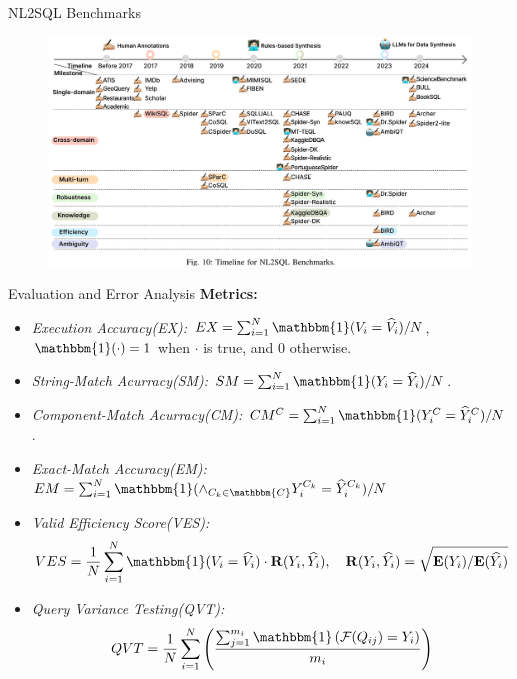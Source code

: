 \documentclass[aspectratio=169,xcolor=dvipsnames]{beamer}
\begin{document}

\begin{frame}{NL2SQL Benchmarks}
    \begin{figure}
        \includegraphics[width=\linewidth]{assets/benchmarks.png}
    \end{figure}
\end{frame}


\begin{frame}{Evaluation and Error Analysis}
    \textbf{Metrics: }
    \begin{itemize}
        \item \textit{Execution Accuracy(EX):} $EX=\sum_{i=1}^N \mathbbm{1}(V_i=\widehat{V}_i) / N$, $\mathbbm{1}(\cdot)=1$ when $\cdot$ is true, and $0$ otherwise.
        \item \textit{String-Match Acurracy(SM):} $SM=\sum_{i=1}^N \mathbbm{1}(Y_i=\widehat{Y}_i) / N$.
        \item \textit{Component-Match Acurracy(CM):} $CM^C=\sum_{i=1}^N \mathbbm{1}(Y_i^C=\widehat{Y}_i^C) / N$.
        \item \textit{Exact-Match Accuracy(EM):}$EM=\sum_{i=1}^N \mathbbm{1}(\land_{C_k\in \mathbbm{C}} Y_i^{C_k}=\widehat{Y}_i^{C_k}) / N$
        \item \textit{Valid Efficiency Score(VES):}
        \[
            VES=\frac{1}{N}\sum_{i=1}^N \mathbbm{1}(V_i=\widehat{V}_i)\cdot \mathbf{R}(Y_i, \widehat{Y_i}),\quad \mathbf{R}(Y_i, \widehat{Y_i}) =\sqrt{\mathbf{E}(Y_i)/\mathbf{E}(\widehat{Y_i})}
        \]
        \item \textit{Query Variance Testing(QVT):}
        \[
            QVT=\frac{1}{N}\sum_{i=1}^N \left(\frac{\sum_{j=1}^{m_i}\mathbbm{1}\left(\mathcal{F} (Q_{ij})=Y_i\right)}{m_i}\right)
        \]
    \end{itemize}
\end{frame}
\end{document}
